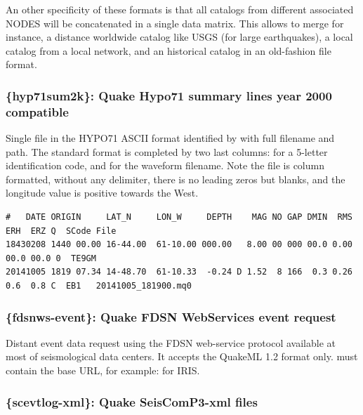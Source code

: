 An other specificity of these formats is that all catalogs from different associated NODES will be concatenated in a single data matrix. This allows to merge for instance, a distance worldwide catalog like USGS (for large earthquakes), a local catalog from a local network, and an historical catalog in an old-fashion file format.

\subsubsection{\{hyp71sum2k\}: Quake Hypo71 summary lines year 2000 compatible}

Single file in the HYPO71 ASCII format identified by  with full filename and path. The standard format is completed by two last columns:  for a 5-letter identification code, and  for the waveform filename. Note the file is column formatted, without any delimiter, there is no leading zeros but blanks, and the longitude value is positive towards the West.

\begin{lstlisting}[title=HYPO71 format example]
#   DATE ORIGIN     LAT_N     LON_W     DEPTH    MAG NO GAP DMIN  RMS  ERH  ERZ Q  SCode File
18430208 1440 00.00 16-44.00  61-10.00 000.00   8.00 00 000 00.0 0.00 00.0 00.0 0  TE9GM
20141005 1819 07.34 14-48.70  61-10.33  -0.24 D 1.52  8 166  0.3 0.26  0.6  0.8 C  EB1   20141005_181900.mq0
\end{lstlisting}


\subsubsection{\{fdsnws-event\}: Quake FDSN WebServices event request}

Distant event data request using the FDSN web-service protocol available at most of seismological data centers. It accepts the QuakeML 1.2 format only.  must contain the base URL, for example:  for IRIS.


\subsubsection{\{scevtlog-xml\}: Quake SeisComP3-xml files}

